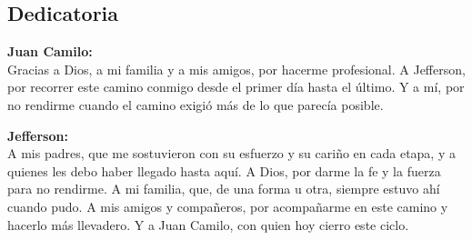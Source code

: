 \subsection*{Dedicatoria}
\vspace*{1.5cm}
{\hfill
    \begin{minipage}{0.5\textwidth}
        \noindent
        \textbf{Juan Camilo:}\\[0.3cm]
        Gracias a Dios, a mi familia y a mis amigos, por hacerme profesional.
        A Jefferson, por recorrer este camino conmigo desde el primer día
        hasta el último. Y a mí, por no rendirme cuando el camino exigió más
        de lo que parecía posible.\\
        \vspace*{2.5cm}

        \noindent
        \textbf{Jefferson:}\\[0.3cm]
        A mis padres, que me sostuvieron con su esfuerzo y su cariño en cada
        etapa, y a quienes les debo haber llegado hasta aquí. A Dios, por
        darme la fe y la fuerza para no rendirme. A mi familia, que, de una
        forma u otra, siempre estuvo ahí cuando pudo. A mis amigos y
        compañeros, por acompañarme en este camino y hacerlo más llevadero.
        Y a Juan Camilo, con quien hoy cierro este ciclo.
        \vspace*{1cm}
    \end{minipage}
}
\newpage
